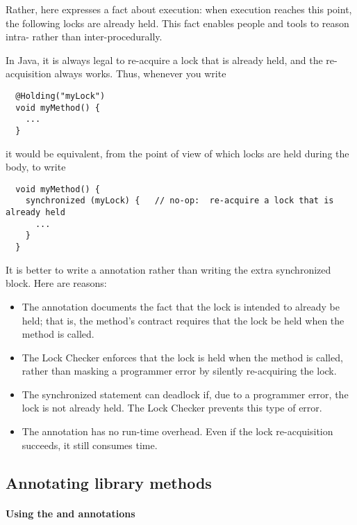   Rather, here  expresses a fact about execution:  when
  execution reaches this point, the following locks are already held.  This
  fact enables people and tools to reason intra- rather than
  inter-procedurally.

  In Java, it is always legal to re-acquire a lock that is already held,
  and the re-acquisition always works.  Thus, whenever you write

\begin{Verbatim}
  @Holding("myLock")
  void myMethod() {
    ...
  }
\end{Verbatim}

\noindent
it would be equivalent, from the point of view of which locks are held
during the body, to write

\begin{Verbatim}
  void myMethod() {
    synchronized (myLock) {   // no-op:  re-acquire a lock that is already held
      ...
    }
  }
\end{Verbatim}


It is better to write a  annotation rather than writing the
extra synchronized block.  Here are reasons:

\begin{itemize}
\item
  The annotation documents the fact that the lock is intended to already be
  held;  that is, the method's contract requires that the lock be held when
  the method is called.
\item
  The Lock Checker enforces that the lock is held when the method is
  called, rather than masking a programmer error by silently re-acquiring
  the lock.
\item
  The synchronized statement can deadlock if, due to a programmer error,
  the lock is not already held.  The Lock Checker prevents this type of
  error.
\item
  The annotation has no run-time overhead.  Even if the lock re-acquisition
  succeeds, it still consumes time.
\end{itemize}


\subsection{Annotating library methods\label{lock-checker-library-methods}}

\paragraph{Using the  and  annotations\label{lock-checker-library-methods-unknownguard-and-nonleaked}}

